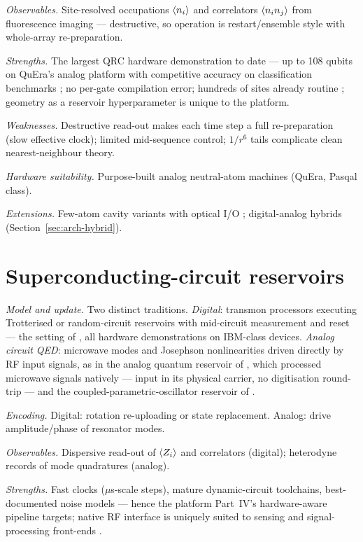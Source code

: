 \emph{Observables.} Site-resolved occupations $\langle n_i\rangle$ and correlators
$\langle n_in_j\rangle$ from fluorescence imaging --- destructive, so operation is
restart/ensemble style with whole-array re-preparation.

\emph{Strengths.} The largest QRC hardware demonstration to date --- up to
108 qubits on QuEra's analog platform with competitive accuracy on
classification benchmarks \citep{kornjaca2024large}; no per-gate compilation
error; hundreds of sites already routine
\citep{bluvstein2024logical}; geometry as a reservoir hyperparameter is unique
to the platform.

\emph{Weaknesses.} Destructive read-out makes each time step a full
re-preparation (slow effective clock); limited mid-sequence control;
$1/r^6$ tails complicate clean nearest-neighbour theory.

\emph{Hardware suitability.} Purpose-built analog neutral-atom machines
(QuEra, Pasqal class).

\emph{Extensions.} Few-atom cavity variants with optical I/O
\citep{zhu2025practical}; digital-analog hybrids
(Section~\ref{sec:arch-hybrid}).

\section{Superconducting-circuit reservoirs}
\label{sec:arch-superconducting}

\emph{Model and update.} Two distinct traditions. \emph{Digital}: transmon
processors executing Trotterised or random-circuit reservoirs with mid-circuit
measurement and reset --- the setting of
\citet{chen2020temporal,suzuki2022natural,hu2024overcoming,yasuda2023quantum},
all hardware demonstrations on IBM-class devices. \emph{Analog circuit QED}:
microwave modes and Josephson nonlinearities driven directly by RF input
signals, as in the analog quantum reservoir of \citet{senanian2024microwave},
which processed microwave signals natively --- input in its physical carrier,
no digitisation round-trip --- and the coupled-parametric-oscillator reservoir
of \citet{dudas2023quantum}.

\emph{Encoding.} Digital: rotation re-uploading or state replacement. Analog:
drive amplitude/phase of resonator modes.

\emph{Observables.} Dispersive read-out of $\langle Z_i\rangle$ and correlators
(digital); heterodyne records of mode quadratures (analog).

\emph{Strengths.} Fast clocks ($\mu$s-scale steps), mature
dynamic-circuit toolchains, best-documented noise models --- hence the platform
Part~IV's hardware-aware pipeline targets; native RF interface is uniquely
suited to sensing and signal-processing front-ends
\citep{senanian2024microwave,angelatos2021reservoir}.

